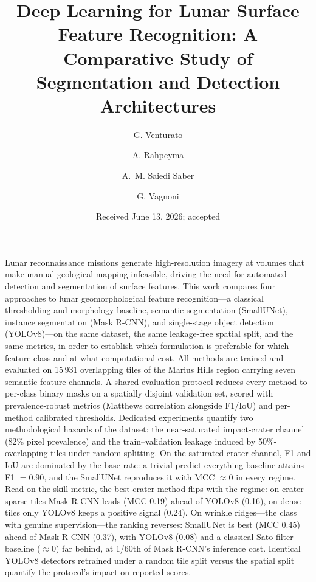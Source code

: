 \documentclass{aa}
\begin{document}
 

   \title{Deep Learning for Lunar Surface Feature Recognition:
          A Comparative Study of Segmentation and Detection Architectures}

   \author{G. Venturato
          \and
          A. Rahpeyma
          \and
          A.~M. Saiedi Saber
          \and
          G. Vagnoni
          }


   \date{Received June 13, 2026; accepted}

   \abstract
    {Lunar reconnaissance missions generate high-resolution imagery at volumes that make manual geological mapping infeasible, driving the need for automated detection and segmentation of surface features.}
    {This work compares four approaches to lunar geomorphological feature recognition---a classical thresholding-and-morphology baseline, semantic segmentation (SmallUNet), instance segmentation (Mask R-CNN), and single-stage object detection (YOLOv8)---on the same dataset, the same leakage-free spatial split, and the same metrics, in order to establish which formulation is preferable for which feature class and at what computational cost.}
    {All methods are trained and evaluated on 15\,931 overlapping tiles of the Marius Hills region carrying seven semantic feature channels. A shared evaluation protocol reduces every method to per-class binary masks on a spatially disjoint validation set, scored with prevalence-robust metrics (Matthews correlation alongside F1/IoU) and per-method calibrated thresholds. Dedicated experiments quantify two methodological hazards of the dataset: the near-saturated impact-crater channel (82\% pixel prevalence) and the train--validation leakage induced by 50\%-overlapping tiles under random splitting.}
    {On the saturated crater channel, F1 and IoU are dominated by the base rate: a trivial predict-everything baseline attains F1 $= 0.90$, and the SmallUNet reproduces it with MCC $\approx 0$ in every regime. Read on the skill metric, the best crater method flips with the regime: on crater-sparse tiles Mask R-CNN leads (MCC 0.19) ahead of YOLOv8 (0.16), on dense tiles only YOLOv8 keeps a positive signal (0.24). On wrinkle ridges---the class with genuine supervision---the ranking reverses: SmallUNet is best (MCC 0.45) ahead of Mask R-CNN (0.37), with YOLOv8 (0.08) and a classical Sato-filter baseline ($\approx 0$) far behind, at 1/60th of Mask R-CNN's inference cost. Identical YOLOv8 detectors retrained under a random tile split versus the spatial split quantify the protocol's impact on reported scores.}
\end{document}
